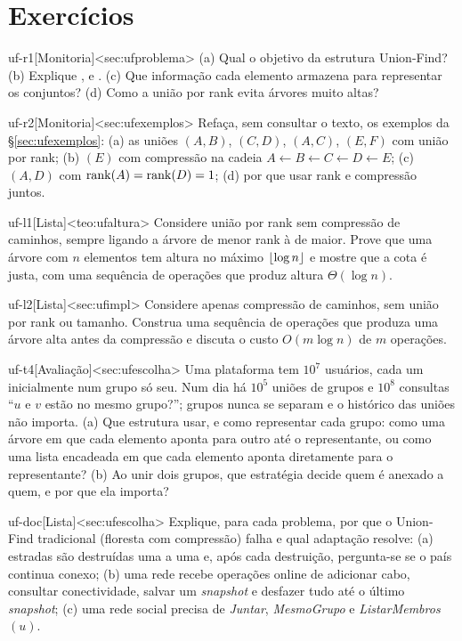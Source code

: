 \section{Exercícios}
\excurso
\begin{exercicio}{uf-r1}[Monitoria]<sec:ufproblema>
(a) Qual o objetivo da estrutura Union-Find? (b) Explique \MakeSet, \Find{} e \Union. (c) Que informação cada elemento armazena para representar os conjuntos? (d) Como a união por rank evita árvores muito altas?
\end{exercicio}
\begin{exercicio}{uf-r2}[Monitoria]<sec:ufexemplos>
Refaça, sem consultar o texto, os exemplos da §\ref{sec:ufexemplos}: (a) as uniões \Union$(A,B)$, \Union$(C,D)$, \Union$(A,C)$, \Union$(E,F)$ com união por rank; (b) \Find$(E)$ com compressão na cadeia $A\leftarrow B\leftarrow C\leftarrow D\leftarrow E$; (c) \Union$(A,D)$ com $\operatorname{rank}(A)=\operatorname{rank}(D)=1$; (d) por que usar rank e compressão juntos.
\end{exercicio}
\begin{exercicio}{uf-l1}[Lista]<teo:ufaltura>
Considere união por rank sem compressão de caminhos, sempre ligando a árvore de menor rank à de maior. Prove que uma árvore com $n$ elementos tem altura no máximo $\lfloor\log n\rfloor$ e mostre que a cota é justa, com uma sequência de operações que produz altura $\Theta(\log n)$.
\end{exercicio}
\begin{exercicio}{uf-l2}[Lista]<sec:ufimpl>
Considere apenas compressão de caminhos, sem união por rank ou tamanho. Construa uma sequência de operações que produza uma árvore alta antes da compressão e discuta o custo $O(m\log n)$ de $m$ operações.
\end{exercicio}
\begin{exercicio}{uf-t4}[Avaliação]<sec:ufescolha>
Uma plataforma tem $10^7$ usuários, cada um inicialmente num grupo só seu. Num dia há $10^5$ uniões de grupos e $10^8$ consultas ``$u$ e $v$ estão no mesmo grupo?''; grupos nunca se separam e o histórico das uniões não importa. (a) Que estrutura usar, e como representar cada grupo: como uma árvore em que cada elemento aponta para outro até o representante, ou como uma lista encadeada em que cada elemento aponta diretamente para o representante? (b) Ao unir dois grupos, que estratégia decide quem é anexado a quem, e por que ela importa?
\end{exercicio}
\begin{exercicio}{uf-doc}[Lista]<sec:ufescolha>
Explique, para cada problema, por que o Union-Find tradicional (floresta com compressão) falha e qual adaptação resolve: (a) estradas são destruídas uma a uma e, após cada destruição, pergunta-se se o país continua conexo; (b) uma rede recebe operações online de adicionar cabo, consultar conectividade, salvar um \emph{snapshot} e desfazer tudo até o último \emph{snapshot}; (c) uma rede social precisa de \emph{Juntar}, \emph{MesmoGrupo} e \emph{ListarMembros}$(u)$.
\end{exercicio}
